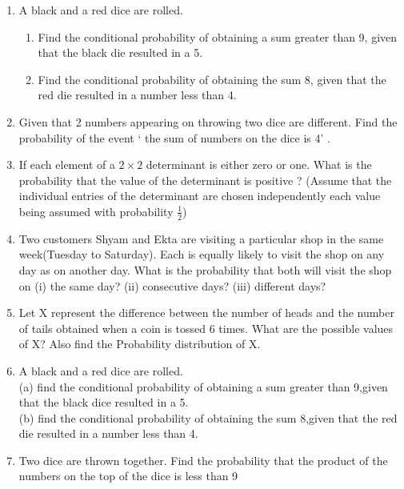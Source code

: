 \begin{enumerate}[label=\thechapter.\arabic*,ref=\thechapter.\theenumi]
\item A black and a red dice are rolled.
\begin{enumerate}
    \item Find the conditional probability of obtaining a sum greater than 9, given
that the black die resulted in a 5.
    \item Find the conditional probability of obtaining the sum 8, given that the red die
resulted in a number less than 4.
\end{enumerate}
		\solution
		
	\item Given that 2 numbers appearing on throwing two dice are different. Find the probability of the event ‘ the sum of numbers on the dice is 4’ .
		\\
		\solution
		
 \item If each element of a $2\times 2$ determinant is either zero or one. What is the probability that the value of the determinant is positive ? 
 (Assume that the individual entries of the determinant are chosen independently each value being assumed with probability $\frac{1}{2}$) \\
 \solution
		
\item Two customers Shyam and Ekta are visiting a particular shop in the same week(Tuesday to Saturday). Each is equally likely to visit the shop on any day as on another day. What is the probability that both will visit the shop on (i) the same day? (ii) consecutive days? (iii) different days?
\\
	
\item Let X represent the difference between the number of heads and the number of tails obtained when a coin is tossed 6 times. What are the possible values of X? Also find the Probability distribution of X.
\\
       
       \item A black and a red dice are rolled.\\
(a) find the conditional probability of obtaining a sum greater than 9,given that the black dice resulted in a 5.\\
(b) find the conditional probability of obtaining the sum 8,given that the red die resulted in a number less than 4.\\
\solution

\item Two dice are thrown together. Find the probability that the product of the numbers on the top of the dice is less than 9\\ 

\end{enumerate}
 
